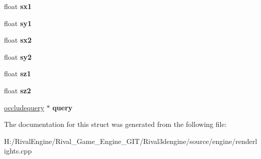 \begin{DoxyCompactItemize}
float {\bfseries sx1}
\item 
\mbox{\label{structlightinfo_abb7ce529d63a6cd648b5f1d0679459a5}} 
float {\bfseries sy1}
\item 
\mbox{\label{structlightinfo_a8f742293c0aca03b62d0c378ed3029ee}} 
float {\bfseries sx2}
\item 
\mbox{\label{structlightinfo_ab0b5ac2b6d24b292012588302fb8c5af}} 
float {\bfseries sy2}
\item 
\mbox{\label{structlightinfo_a54946c55382004082f85d24314b4a076}} 
float {\bfseries sz1}
\item 
\mbox{\label{structlightinfo_ada317a27e92a3a41a65a7d5dfd4775a0}} 
float {\bfseries sz2}
\item 
\mbox{\label{structlightinfo_a8c8241a689e36979cd95eec533c50638}} 
\hyperlink{structoccludequery}{occludequery} $\ast$ {\bfseries query}
\end{DoxyCompactItemize}


The documentation for this struct was generated from the following file\+:\begin{DoxyCompactItemize}
\item 
H\+:/\+Rival\+Engine/\+Rival\+\_\+\+Game\+\_\+\+Engine\+\_\+\+G\+I\+T/\+Rival3dengine/source/engine/renderlights.\+cpp\end{DoxyCompactItemize}
